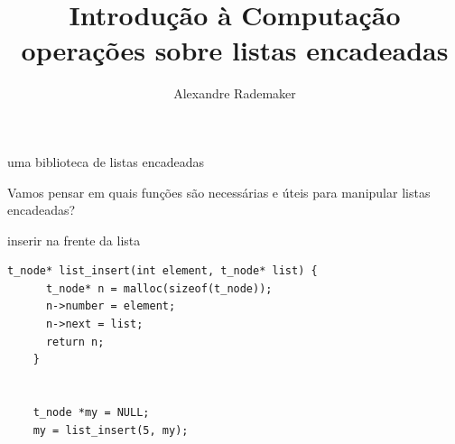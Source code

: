 \documentclass{beamer}
\title{Introdução à Computação \\ operações sobre listas encadeadas}
\author{Alexandre Rademaker}
\date{}
\begin{document}
\begin{frame}
 \maketitle
\end{frame}

\begin{frame}{uma biblioteca de listas encadeadas}

  Vamos pensar em quais funções são necessárias e úteis para manipular
  listas encadeadas?

\end{frame}


\begin{frame}{inserir na frente da lista}

  \begin{lstlisting}[style=normalc]
    t_node* list_insert(int element, t_node* list) {
      t_node* n = malloc(sizeof(t_node));
      n->number = element;
      n->next = list;
      return n;
    }

    
    t_node *my = NULL;
    my = list_insert(5, my);
  \end{lstlisting}

\end{frame}
\end{document}
